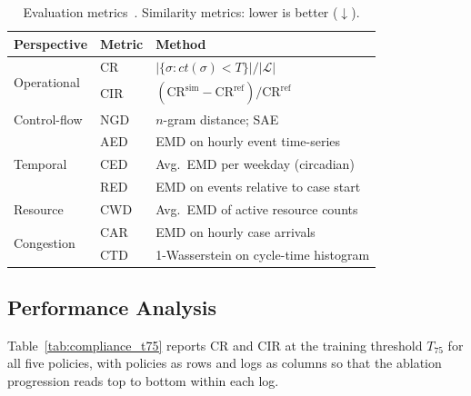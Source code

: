 \documentclass[journal,onecolumn]{IEEEtran}
\begin{document}
\begin{table}[!ht]
\centering\small
\setlength{\tabcolsep}{3pt}
\begin{tabular}{@{} l l p{4.4cm} @{}}
\toprule
\textbf{Perspective} & \textbf{Metric} & \textbf{Method} \\
\midrule
\multirow{2}{*}{Operational}
  & CR  & $|\{\sigma:ct(\sigma)<T\}|/|\mathcal{L}|$ \\
  & CIR & $(\mathrm{CR}^{\mathrm{sim}}-\mathrm{CR}^{\mathrm{ref}})/\mathrm{CR}^{\mathrm{ref}}$ \\
\midrule
Control-flow & NGD & $n$-gram distance; SAE \\
\midrule
\multirow{3}{*}{Temporal}
  & AED & EMD on hourly event time-series \\
  & CED & Avg.\ EMD per weekday (circadian) \\
  & RED & EMD on events relative to case start \\
\midrule
Resource & CWD & Avg.\ EMD of active resource counts \\
\midrule
\multirow{2}{*}{Congestion}
  & CAR & EMD on hourly case arrivals \\
  & CTD & 1-Wasserstein on cycle-time histogram \\
\bottomrule
\end{tabular}
\caption[Evaluation metrics]{Evaluation metrics~\cite{framework_for_measuring_the_quality_of_business_process_simulation_models}.
Similarity metrics: lower is better ($\downarrow$).}
\label{tab:metrics}
\end{table}


\subsection{Performance Analysis}
\label{subsec:performance}

Table~\ref{tab:compliance_t75} reports CR and CIR at the training
threshold $T_{75}$ for all five policies, with policies as rows and
logs as columns so that the ablation progression reads top to
bottom within each log.
\end{document}

